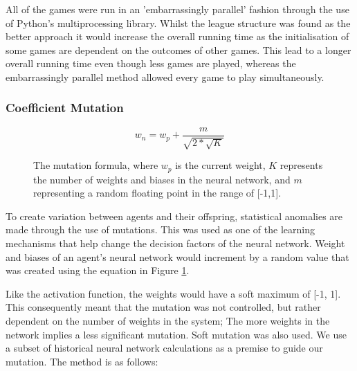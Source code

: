 \documentclass[12pt,a4paper]{article}
\begin{document}
            All of the games were run in an 'embarrassingly parallel' fashion through the use of Python's multiprocessing library. Whilst the league structure was found as the better approach \cite{al-khateeb_introducing_2009} it would increase the overall running time as the initialisation of some games are dependent on the outcomes of other games. This lead to a longer overall running time even though less games are played, whereas the embarrassingly parallel method allowed every game to play simultaneously.
            
        \subsubsection{Coefficient Mutation} \label{coefficient_mutation}

            \begin{figure}
            \begin{equation}
                w_n = w_p + \frac{m}{\sqrt{2 * \sqrt{K} }}
            \end{equation}
            \caption{The mutation formula, where $w_p$ is the current weight, $K$ represents the number of weights and biases in the neural network, and $m$ representing a random floating point in the range of [-1,1].\label{mutation}}
            \end{figure}

            To create variation between agents and their offspring, statistical anomalies are made through the use of mutations. This was used as one of the learning mechanisms that help change the decision factors of the neural network. Weight and biases of an agent's neural network would increment by a random value that was created using the equation in Figure \ref{mutation}.

            Like the activation function,
            the weights would have a soft maximum of [-1, 1]. This consequently meant that the mutation was not controlled, but rather dependent on the number of weights in the system; The more weights in the network implies a less significant mutation. Soft mutation \cite{lehman_safe_2017} was also used. We use a subset of historical neural network calculations as a premise to guide our mutation. The method is as follows:
             
\end{document}
